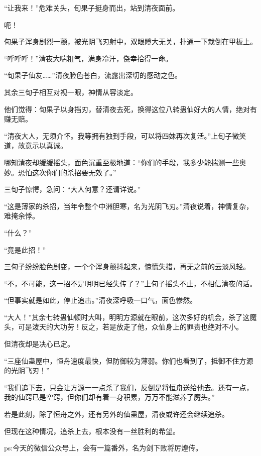 \begin{this_body}
“让我来！”危难关头，旬果子挺身而出，站到清夜面前。

呃！

旬果子浑身剧烈一颤，被光阴飞刃射中，双眼瞪大无关，扑通一下栽倒在甲板上。

“呼呼呼！”清夜大喘粗气，满身冷汗，侥幸拾得一命。

“旬果子仙友……”清夜脸色苍白，流露出深切的感动之色。

其余三旬子相互对视一眼，神情从容淡定。

他们觉得：旬果子以身挡刃，替清夜去死，换得这位八转蛊仙好大的人情，绝对有赚无赔。

“清夜大人，无须介怀。我等拥有独到手段，可以将四妹再次复活。”上旬子微笑道，故意示以真诚。

哪知清夜却缓缓摇头，面色沉重至极地道：“你们的手段，我多少能揣测一些奥妙。恐怕这次你们的杀招要无效了。”

三旬子惊愕，急问：“大人何意？还请详说。”

“这是薄家的杀招，当年令整个中洲胆寒，名为光阴飞刃。”清夜说着，神情复杂，难掩余悸。

“什么？”

“竟是此招！”

三旬子纷纷脸色剧变，一个个浑身颤抖起来，惊慌失措，再无之前的云淡风轻。

“不，不可能，这一招不是明明已经失传了？”上旬子摇头不止，不相信清夜的话。

“但事实就是如此，停止追击。”清夜深呼吸一口气，面色惨然。

“大人！”其余七转蛊仙顿时大叫，明明方源就在眼前，这次多好的机会，杀了这魔头，可是泼天的大功劳！反之，若是放走了他，众仙身上的罪责也绝对不小。

但清夜却是决心已定。

“三座仙蛊屋中，恒舟速度最快，但防御较为薄弱。你们也看到了，抵御不住方源的光阴飞刃！”

“我们追下去，只会让方源一一点杀了我们，反倒是将恒舟送给他去。还有一点，我的仙窍已是空窍，但你们却有着一身积累，万万不能滋养了魔头。”

若是此刻，除了恒舟之外，还有另外的仙蛊屋，清夜或许还会继续追杀。

但现在这种情况，追杀上去，根本没有一丝胜利的希望。

ps:今天的微信公众号上，会有一篇番外，名为剑下败将厉煌传。

\end{this_body}

